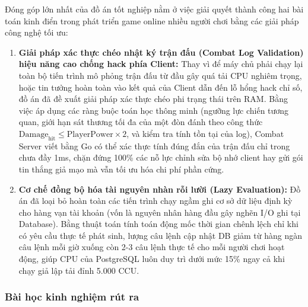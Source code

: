 \documentclass[../Project.tex]{subfiles}
\begin{document}
Đóng góp lớn nhất của đồ án tốt nghiệp nằm ở việc giải quyết thành công hai bài toán kinh điển trong phát triển game online nhiều người chơi bằng các giải pháp công nghệ tối ưu:
\begin{enumerate}
    \item \textbf{Giải pháp xác thực chéo nhật ký trận đấu (Combat Log Validation) hiệu năng cao chống hack phía Client:} Thay vì để máy chủ phải chạy lại toàn bộ tiến trình mô phỏng trận đấu từ đầu gây quá tải CPU nghiêm trọng, hoặc tin tưởng hoàn toàn vào kết quả của Client dẫn đến lỗ hổng hack chỉ số, đồ án đã đề xuất giải pháp xác thực chéo phi trạng thái trên RAM. Bằng việc áp dụng các ràng buộc toán học thông minh (ngưỡng lực chiến tương quan, giới hạn sát thương tối đa của một đòn đánh theo công thức \( \text{Damage}_{\text{hit}} \le \text{PlayerPower} \times 2 \), và kiểm tra tính tồn tại của log), Combat Server viết bằng Go có thể xác thực tính đúng đắn của trận đấu chỉ trong chưa đầy 1ms, chặn đứng 100\% các nỗ lực chỉnh sửa bộ nhớ client hay gửi gói tin thắng giả mạo mà vẫn tối ưu hóa chi phí phần cứng.
    \item \textbf{Cơ chế đồng bộ hóa tài nguyên nhàn rỗi lười (Lazy Evaluation):} Đồ án đã loại bỏ hoàn toàn các tiến trình chạy ngầm ghi cơ sở dữ liệu định kỳ cho hàng vạn tài khoản (vốn là nguyên nhân hàng đầu gây nghẽn I/O ghi tại Database). Bằng thuật toán tính toán động mốc thời gian chênh lệch chỉ khi có yêu cầu thực tế phát sinh, lượng câu lệnh cập nhật DB giảm từ hàng ngàn câu lệnh mỗi giờ xuống còn 2-3 câu lệnh thực tế cho mỗi người chơi hoạt động, giúp CPU của PostgreSQL luôn duy trì dưới mức 15\% ngay cả khi chạy giả lập tải đỉnh 5.000 CCU.
\end{enumerate}

\subsubsection{Bài học kinh nghiệm rút ra}
\end{document}
